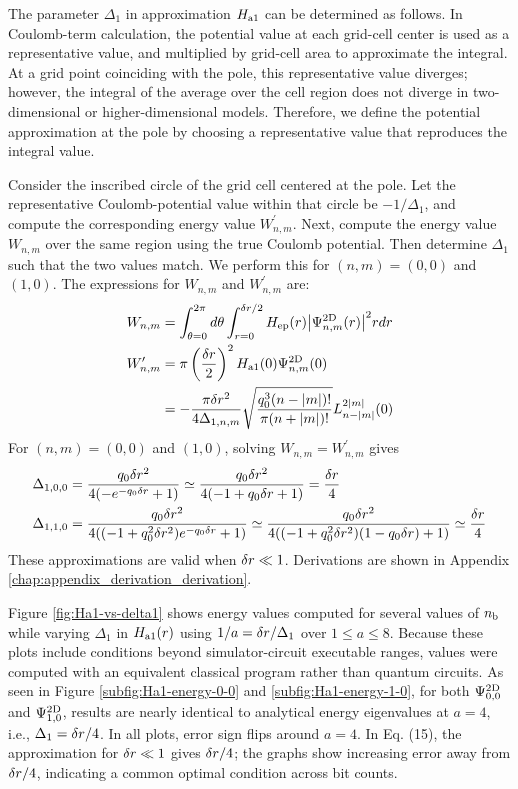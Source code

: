 \documentclass[a4paper,11pt]{article}
\begin{document}
The parameter $\Delta_1$ in approximation $H_{\mathrm{a1}}$ can be determined as follows.
In Coulomb-term calculation, the potential value at each grid-cell center is
used as a representative value, and multiplied by grid-cell area to approximate
the integral. At a grid point coinciding with the pole, this representative
value diverges; however, the integral of the average over the cell region does
not diverge in two-dimensional or higher-dimensional models. Therefore, we
define the potential approximation at the pole by choosing a representative
value that reproduces the integral value.

Consider the inscribed circle of the grid cell centered at the pole. Let the
representative Coulomb-potential value within that circle be $-1/\Delta_1$, and
compute the corresponding energy value $W_{n,m}^\prime$. Next, compute the
energy value $W_{n,m}$ over the same region using the true Coulomb potential.
Then determine $\Delta_1$ such that the two values match. We perform this for
$(n,m)=(0,0)$ and $(1,0)$. The expressions for $W_{n,m}$ and
$W_{n,m}^\prime$ are:
\begin{align}
    W_{n,m}&=\int_{\theta=0}^{2\pi}d\theta\int_{r=0}^{\delta r/2}
    H_{\mathrm{ep}}(r){\left| \Psi^{\mathrm{2D}}_{n,m}(r) \right|}^2r dr\\
    W_{n,m}^\prime&=\pi\left(\frac{\delta r}{2}\right)^2
    H_{\mathrm{a1}}(0)\Psi^{\mathrm{2D}}_{n,m}(0) \notag \\
    &=-\frac{\pi\delta r^2}{4\Delta_{1,n,m}}
    \sqrt{\frac{q_0^3(n-{\left| m \right|})!}{\pi(n+{\left| m \right|})!}}
    L_{n-{\left| m \right|}}^{2{\left| m \right|}}(0)
\end{align}
For $(n,m)=(0,0)$ and $(1,0)$, solving $W_{n,m}=W_{n,m}^\prime$ gives
\begin{align}
    \Delta_{1,0,0} &=\frac{q_0\delta r^2}{4(-e^{-q_0\delta r}+1)}
    \simeq \frac{q_0\delta r^2}{4(-1+q_0\delta r+1)}=\frac{\delta r}{4}
    \label{eq:delta-1-0-0}\\
    \Delta_{1,1,0} &=\frac{q_0\delta r^2}{4((-1+q_0^2\delta r^2)e^{-q_0\delta r}+1)}
    \simeq \frac{q_0\delta r^2}{4((-1+q_0^2\delta r^2)(1-q_0\delta r)+1)}
    \simeq\frac{\delta r}{4}
    \label{eq:delta-1-1-0}
\end{align}
These approximations are valid when $\delta r\ll1$. Derivations are shown in
Appendix \ref{chap:appendix_derivation_derivation}.

Figure \ref{fig:Ha1-vs-delta1} shows energy values computed for several values
of $n_{\mathrm{b}}$ while varying $\Delta_1$ in $H_{\mathrm{a1}}(r)$ using
$1/a=\delta r/\Delta_1$ over $1\le a\le8$. Because these plots include
conditions beyond simulator-circuit executable ranges, values were computed
with an equivalent classical program rather than quantum circuits. As seen in
Figure \ref{subfig:Ha1-energy-0-0} and \ref{subfig:Ha1-energy-1-0}, for both
$\Psi^{\mathrm{2D}}_{0,0}$ and $\Psi^{\mathrm{2D}}_{1,0}$, results are nearly identical to
analytical energy eigenvalues at $a=4$, i.e., $\Delta_1=\delta r/4$. In all
plots, error sign flips around $a=4$. In Eq. (15), the approximation for
$\delta r\ll1$ gives $\delta r/4$; the graphs show increasing error away from
$\delta r/4$, indicating a common optimal condition across bit counts.
\end{document}
